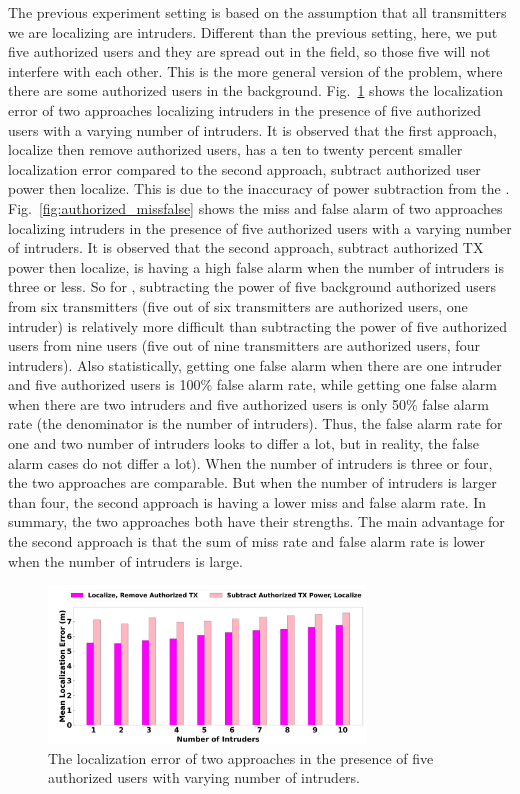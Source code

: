 The previous experiment setting is based on the assumption that all transmitters we are localizing are intruders.
Different than the previous setting, here, we put five authorized users and they are spread out in the field, so those five will not interfere with each other.
This is the more general version of the \mtl problem, where there are some authorized users in the background.
Fig.~\ref{fig:authorized_error} shows the localization error of two approaches localizing intruders in the presence of five authorized users with a varying number of intruders.
It is observed that the first approach, localize then remove authorized users, has a ten to twenty percent smaller localization error compared to the second approach, subtract authorized user power then localize.
This is due to the inaccuracy of power subtraction from the \subtract.
Fig.~\ref{fig:authorized_missfalse} shows the miss and false alarm of two approaches localizing intruders in the presence of five authorized users with a varying number of intruders.
It is observed that the second approach, subtract authorized TX power then localize, is having a high false alarm when the number of intruders is three or less.
So for \subtract, subtracting the power of five background authorized users from six transmitters (five out of six transmitters are authorized users, one intruder) is relatively more difficult than subtracting the power of five authorized users from nine users (five out of nine transmitters are authorized users, four intruders). 
Also statistically, getting one false alarm when there are one intruder and five authorized users is 100\% false alarm rate, while getting one false alarm when there are two intruders and five authorized users is only 50\% false alarm rate (the denominator is the number of intruders).
Thus, the false alarm rate for one and two number of intruders looks to differ a lot, but in reality, the false alarm cases do not differ a lot).
When the number of intruders is three or four, the two approaches are comparable. But when the number of intruders is larger than four, the second approach is having a lower miss and false alarm rate.
In summary, the two approaches both have their strengths.
The main advantage for the second approach is that the sum of miss rate and false alarm rate is lower when the number of intruders is large.

\begin{figure}[t]
    \centering
    \includegraphics[width=0.75\textwidth]{chapters/wowmom-pmc/figures/splat-error-authorized-varyintru.png}
    \caption{The localization error of two approaches in the presence of five authorized users with varying number of intruders.}
    \label{fig:authorized_error}
\end{figure}

